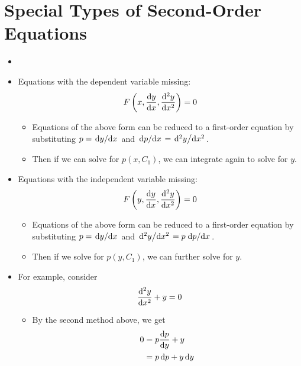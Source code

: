 \documentclass[../main.tex]{subfiles}
\begin{document}
\section{Special Types of Second-Order Equations}
\begin{itemize}
    \item {}
    \item Equations with the dependent variable missing:
    \begin{equation*}
        F\left( x,\dv{y}{x},\dv[2]{y}{x} \right) = 0
    \end{equation*}
    \begin{itemize}
        \item Equations of the above form can be reduced to a first-order equation by substituting $p=\dv*{y}{x}$ and $\dv*{p}{x}=\dv*[2]{y}{x}$.
        \item Then if we can solve for $p(x,C_1)$, we can integrate again to solve for $y$.
    \end{itemize}
    \item Equations with the independent variable missing:
    \begin{equation*}
        F\left( y,\dv{y}{x},\dv[2]{y}{x} \right) = 0
    \end{equation*}
    \begin{itemize}
        \item Equations of the above form can be reduced to a first-order equation by substituting $p=\dv*{y}{x}$ and $\dv*[2]{y}{x}=p\dv*{p}{x}$.
        \item Then if we solve for $p(y,C_1)$, we can further solve for $y$.
    \end{itemize}
    \item For example, consider
    \begin{equation*}
        \dv[2]{y}{x}+y = 0
    \end{equation*}
    \begin{itemize}
        \item By the second method above, we get
        \begin{align*}
            0 &= p\dv{p}{y}+y\\
            &= p\dd{p}+y\dd{y}\\

\end{align*}
\end{itemize}
\end{itemize}
\end{document}
